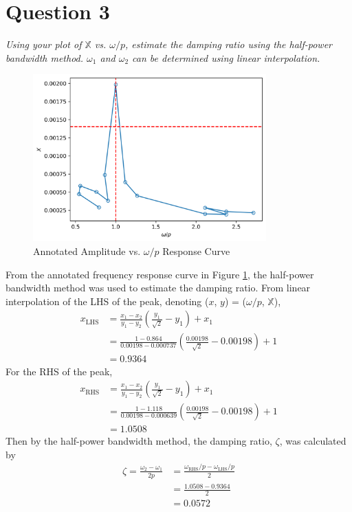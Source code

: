 \section{Question 3}
\textit{Using your plot of $\mathbb{X}$ vs. $\omega/p$, estimate the damping ratio using the half-power bandwidth method. $\omega_1$ and $\omega_2$ can be determined using linear interpolation.}
\begin{figure}[H]
    \centering
    \includegraphics[width=0.8\textwidth]{Questions/Plots/X_vs_omega_p_with_lines.png}
    \caption{Annotated Amplitude vs. $\omega/p$ Response Curve}
    \label{fig:frequency_response_curve_with_lines}
\end{figure}
From the annotated frequency response curve in Figure \ref{fig:frequency_response_curve_with_lines}, the half-power bandwidth method was used to estimate the damping ratio. From linear interpolation of the LHS of the peak, denoting ($x$, $y$) = ($\omega/p$, $\mathbb{X}$), 
\begin{align*}
    x_{\text{LHS}} &= \frac{x_1 - x_2}{y_1 - y_2} \left(\frac{y_1}{\sqrt{2}} - y_1\right) + x_1 \\
    &= \frac{1 - 0.864}{0.00198 - 0.000737} \left(\frac{0.00198}{\sqrt{2}} - 0.00198\right) + 1 \\
    &= 0.9364 
\end{align*}
For the RHS of the peak,
\begin{align*}
    x_{\text{RHS}} &= \frac{x_1 - x_2}{y_1 - y_2} \left(\frac{y_1}{\sqrt{2}} - y_1\right) + x_1 \\
    &= \frac{1 - 1.118}{0.00198 - 0.000639} \left(\frac{0.00198}{\sqrt{2}} - 0.00198\right) + 1 \\
    &= 1.0508
\end{align*}
Then by the half-power bandwidth method, the damping ratio, $\zeta$, was calculated by
\begin{align*}
    \zeta = \frac{\omega_2 - \omega_1}{2p} &= \frac{\omega_{\text{RHS}}/p - \omega_{\text{LHS}}/p}{2} \\
    &= \frac{1.0508 - 0.9364}{2} \\
    &= \boxed{0.0572}
\end{align*}

